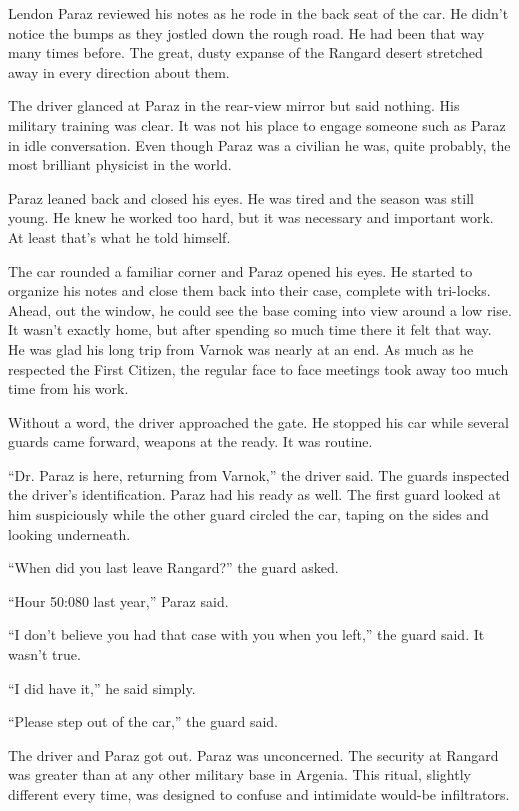 

Lendon Paraz reviewed his notes as he rode in the back seat of the car. He didn't notice the
bumps as they jostled down the rough road. He had been that way many times before. The great,
dusty expanse of the Rangard desert stretched away in every direction about them.

The driver glanced at Paraz in the rear-view mirror but said nothing. His military training was
clear. It was not his place to engage someone such as Paraz in idle conversation. Even though
Paraz was a civilian he was, quite probably, the most brilliant physicist in the world.

Paraz leaned back and closed his eyes. He was tired and the season was still young. He knew he
worked too hard, but it was necessary and important work. At least that's what he told himself.

The car rounded a familiar corner and Paraz opened his eyes. He started to organize his notes
and close them back into their case, complete with tri-locks. Ahead, out the window, he could
see the base coming into view around a low rise. It wasn't exactly home, but after spending so
much time there it felt that way. He was glad his long trip from Varnok was nearly at an end. As
much as he respected the First Citizen, the regular face to face meetings took away too much
time from his work.

Without a word, the driver approached the gate. He stopped his car while several guards came
forward, weapons at the ready. It was routine.

``Dr. Paraz is here, returning from Varnok,'' the driver said. The guards inspected the driver's
identification. Paraz had his ready as well. The first guard looked at him suspiciously while
the other guard circled the car, taping on the sides and looking underneath.

``When did you last leave Rangard?'' the guard asked.

``Hour 50:080 last year,'' Paraz said.

``I don't believe you had that case with you when you left,'' the guard said. It wasn't true.

``I did have it,'' he said simply.

``Please step out of the car,'' the guard said.

The driver and Paraz got out. Paraz was unconcerned. The security at Rangard was greater than at
any other military base in Argenia. This ritual, slightly different every time, was designed to
confuse and intimidate would-be infiltrators.

